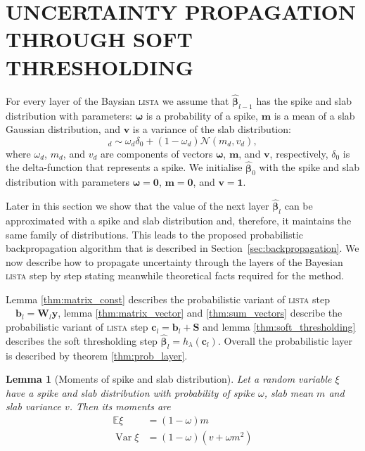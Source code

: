 \documentclass[letterpaper]{article}
\newtheorem{lemma}{Lemma}
\begin{document}
\section{\uppercase{Uncertainty propagation through soft thresholding}}
\label{sec:fprop}
For every layer of the Baysian \textsc{lista} we assume that $\widehat{\boldsymbol\beta}_{l-1}$ has the spike and slab distribution with parameters: $\boldsymbol\omega$ is a probability of a spike, $\mathbf{m}$ is a mean of a slab Gaussian distribution, and $\mathbf{v}$ is a variance of the slab distribution:
\begin{equation}
[\widehat{\boldsymbol\beta}_{l-1}]_d \sim \omega_d \delta_0 + (1 - \omega_d)\mathcal{N}(m_d, v_d),
\end{equation}
where $\omega_d$, $m_d$, and $v_d$ are components of vectors $\boldsymbol\omega$, $\mathbf{m}$, and $\mathbf{v}$, respectively, $\delta_0$ is the delta-function that represents a spike. 
We initialise $\widehat{\boldsymbol\beta}_{0}$ with the spike and slab distribution with parameters $\boldsymbol\omega = \mathbf{0}$, $\mathbf{m} = \mathbf{0}$, and $\mathbf{v} = \mathbf{1}$. 

Later in this section we show that the value of the next layer $\widehat{\boldsymbol\beta}_l$ can be approximated with a spike and slab distribution and, therefore, it maintains the same family of distributions. This leads to the proposed probabilistic backpropagation algorithm that is described in Section~\ref{sec:backpropagation}. We now describe how to propagate uncertainty through the layers of the Bayesian \textsc{lista} step by step stating meanwhile theoretical facts required for the method.

Lemma \ref{thm:matrix_const} describes the probabilistic variant of \textsc{lista} step $\quad \mathbf{b}_l = \mathbf{W}_l \mathbf{y}$, lemma \ref{thm:matrix_vector} and \ref{thm:sum_vectors} describe the probabilistic variant of \textsc{lista} step $ \mathbf{c}_l = \mathbf{b}_l +\mathbf{S}$ and lemma \ref{thm:soft_thresholding} describes the soft thresholding step $\widehat{\boldsymbol\beta}_{l} = h_\lambda(\mathbf{c}_l)$. Overall the probabilistic layer is described by theorem \ref{thm:prob_layer}.

\begin{lemma}[Moments of spike and slab distribution]
\label{thm:moments_spsl}
Let a random variable $\xi$ have a spike and slab distribution with probability of spike $\omega$, slab mean $m$ and slab variance $v$. Then its moments are
\begin{subequations}
\begin{align}
\mathbb{E}\xi &= (1-\omega)m \\
\operatorname{Var}\xi & = (1-\omega)(v + \omega m^2)
\end{align}
\end{subequations}
\end{lemma}
\end{document}
